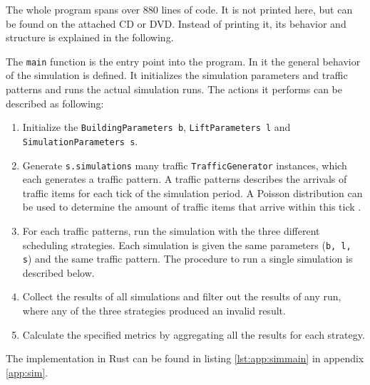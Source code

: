 The whole program spans over 880 lines of code.
It is not printed here, but can be found on the attached CD or DVD.
Instead of printing it, its behavior and structure is explained in the following.

The \texttt{main} function is the entry point into the program.
In it the general behavior of the simulation is defined.
It initializes the simulation parameters and traffic patterns and runs the actual simulation runs.
The actions it performs can be described as following:
\begin{enumerate}
    \item Initialize the \texttt{BuildingParameters b}, \texttt{LiftParameters l} and\\ \texttt{SimulationParameters s}.
    \item Generate \texttt{s.simulations} many traffic \texttt{TrafficGenerator} instances, which each generates a traffic pattern. A traffic patterns describes the arrivals of traffic items for each tick of the simulation period. A Poisson distribution can be used to determine the amount of traffic items that arrive within this tick \autocite{beers2015arrivals}.
    \item For each traffic patterns, run the simulation with the three different scheduling strategies. Each simulation is given the same parameters (\texttt{b, l, s}) and the same traffic pattern. The procedure to run a single simulation is described below.
    \item Collect the results of all simulations and filter out the results of any run, where any of the three strategies produced an invalid result.
    \item Calculate the specified metrics by aggregating all the results for each strategy.
\end{enumerate}
The implementation in Rust can be found in listing \ref{lst:app:simmain} in appendix \ref{app:sim}.

